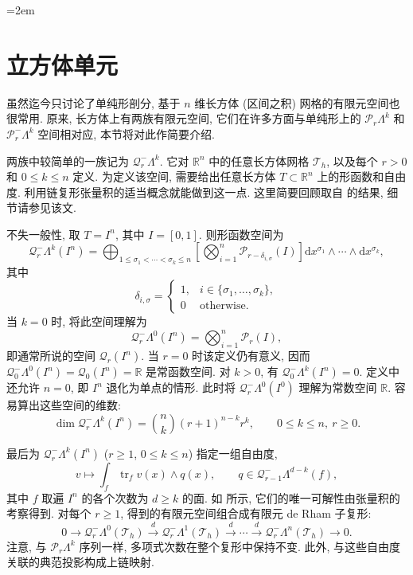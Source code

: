 \begingroup\emergencystretch=2em
\section{立方体单元}\label{sec:cubical-elements}

虽然迄今只讨论了单纯形剖分, 基于 $n$ 维长方体 (区间之积) 网格的有限元空间也很常用. 原来, 长方体上有两族有限元空间, 它们在许多方面与单纯形上的 $\mathcal P_r\Lambda^k$ 和 $\mathcal P_r^-\Lambda^k$ 空间相对应, 本节将对此作简要介绍.

两族中较简单的一族记为 $\mathcal Q_r^-\Lambda^k$. 它对 $\mathbb R^n$ 中的任意长方体网格 $\mathcal T_h$, 以及每个 $r>0$ 和 $0\leq k\leq n$ 定义. 为定义该空间, 需要给出任意长方体 $T\subset\mathbb R^n$ 上的形函数和自由度. 利用链复形张量积的适当概念就能做到这一点. 这里简要回顾取自  的结果, 细节请参见该文.

不失一般性, 取 $T=I^n$, 其中 $I=[0,1]$. 则形函数空间为
\[
\mathcal Q_r^-\Lambda^k(I^n)=\bigoplus_{1\leq\sigma_1<\cdots<\sigma_k\leq n}\left[\bigotimes_{i=1}^n\mathcal P_{r-\delta_{i,\sigma}}(I)\right]\mathrm{d}x^{\sigma_1}\wedge\cdots\wedge \mathrm{d}x^{\sigma_k},
\]
其中
\[
\delta_{i,\sigma}=\begin{cases}1,&i\in\{\sigma_1,\ldots,\sigma_k\},\\0&\text{otherwise}.\end{cases}
\]
当 $k=0$ 时, 将此空间理解为
\[
\mathcal Q_r^-\Lambda^0(I^n)=\bigotimes_{i=1}^n\mathcal P_r(I),
\]
即通常所说的空间 $\mathcal Q_r(I^n)$. 当 $r=0$ 时该定义仍有意义, 因而 $\mathcal Q_0^-\Lambda^0(I^n)=\mathcal Q_0(I^n)=\mathbb R$ 是常函数空间. 对 $k>0$, 有 $\mathcal Q_0^-\Lambda^k(I^n)=0$. 定义中还允许 $n=0$, 即 $I^n$ 退化为单点的情形. 此时将 $\mathcal Q_r^-\Lambda^0(I^0)$ 理解为常数空间 $\mathbb R$. 容易算出这些空间的维数:
\[
\dim\mathcal Q_r^-\Lambda^k(I^n)=\binom nk(r+1)^{n-k}r^k,\qquad0\leq k\leq n,\ r\geq0.
\]

最后为 $\mathcal Q_r^-\Lambda^k(I^n)$ ($r\geq1$, $0\leq k\leq n$) 指定一组自由度,
\begin{equation}\label{eq:tensor-product-form-dofs}
v\mapsto\int_f\operatorname{tr}_fv(x)\wedge q(x),\qquad q\in\mathcal Q_{r-1}^-\Lambda^{d-k}(f),
\end{equation}
其中 $f$ 取遍 $I^n$ 的各个次数为 $d\geq k$ 的面. 如  所示, 它们的唯一可解性由张量积的考察得到. 对每个 $r\geq1$, 得到的有限元空间组合成有限元 de Rham 子复形:
\[
0\to\mathcal Q_r^-\Lambda^0(\mathcal T_h)\xrightarrow{d}\mathcal Q_r^-\Lambda^1(\mathcal T_h)\xrightarrow{d}\cdots\xrightarrow{d}\mathcal Q_r^-\Lambda^n(\mathcal T_h)\to0.
\]
注意, 与 $\mathcal P_r\Lambda^k$ 序列一样, 多项式次数在整个复形中保持不变. 此外, 与这些自由度关联的典范投影构成上链映射.

